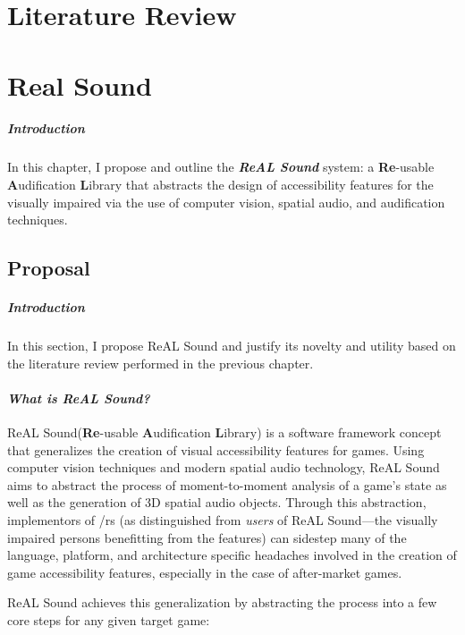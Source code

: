 \documentclass{report}
\newcommand{\rs}{ReAL Sound\xspace}
\newcommand{\rsfull}{\textbf{Re}-usable \textbf{A}udification \textbf{L}ibrary\xspace}
\begin{document}
\chapter{Literature Review} 


\chapter{Real Sound}
\paragraph{Introduction}
In this chapter, I propose and outline the \textbf{\emph{\rs}} system: a \rsfull that abstracts the design of accessibility features for the visually impaired via the use of computer vision, spatial audio, and audification techniques.

\section{Proposal} 
\paragraph{Introduction} 

In this section, I propose \rs and justify its novelty and utility based on the literature review performed in the previous chapter.

\subsubsection{\emph{What is \rs?}}
\rs (\rsfull) is a software framework concept that generalizes the creation of visual accessibility features for games. Using computer vision techniques and modern spatial audio technology, \rs aims to abstract the process of moment-to-moment analysis of a game's state as well as the generation of 3D spatial audio objects. Through this abstraction, implementors of /rs (as distinguished from \emph{users} of \rs---the visually impaired persons benefitting from the features) can sidestep many of the language, platform, and architecture specific headaches involved in the creation of game accessibility features, especially in the case of after-market games. 

\rs achieves this generalization by abstracting the process into a few core steps for any given target game:
\end{document}
